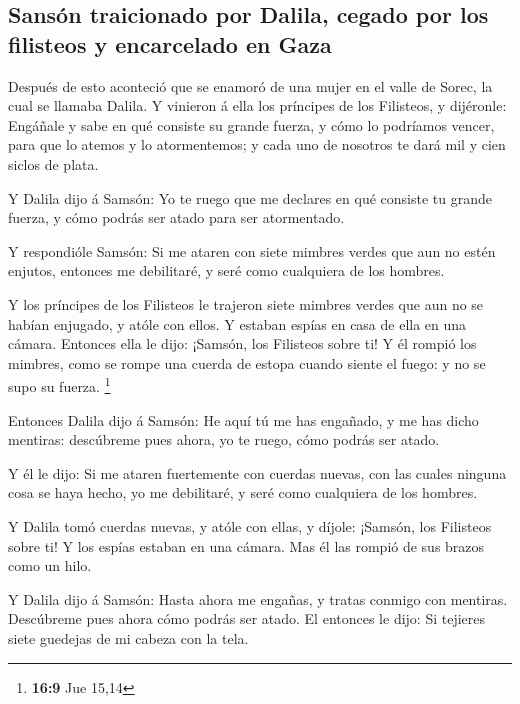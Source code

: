 \hypertarget{sansuxf3n-traicionado-por-dalila-cegado-por-los-filisteos-y-encarcelado-en-gaza}{%
\subsection{Sansón traicionado por Dalila, cegado por los filisteos y
encarcelado en
Gaza}\label{sansuxf3n-traicionado-por-dalila-cegado-por-los-filisteos-y-encarcelado-en-gaza}}

 Después de esto aconteció que se enamoró de una mujer en
el valle de Sorec, la cual se llamaba Dalila.  Y vinieron
á ella los príncipes de los Filisteos, y dijéronle: Engáñale y sabe en
qué consiste su grande fuerza, y cómo lo podríamos vencer, para que lo
atemos y lo atormentemos; y cada uno de nosotros te dará mil y cien
siclos de plata.

 Y Dalila dijo á Samsón: Yo te ruego que me declares en
qué consiste tu grande fuerza, y cómo podrás ser atado para ser
atormentado.

 Y respondióle Samsón: Si me ataren con siete mimbres
verdes que aun no estén enjutos, entonces me debilitaré, y seré como
cualquiera de los hombres.

 Y los príncipes de los Filisteos le trajeron siete
mimbres verdes que aun no se habían enjugado, y atóle con ellos.
 Y estaban espías en casa de ella en una cámara. Entonces
ella le dijo: ¡Samsón, los Filisteos sobre ti! Y él rompió los mimbres,
como se rompe una cuerda de estopa cuando siente el fuego: y no se supo
su fuerza. \footnote{\textbf{16:9} Jue 15,14}

 Entonces Dalila dijo á Samsón: He aquí tú me has
engañado, y me has dicho mentiras: descúbreme pues ahora, yo te ruego,
cómo podrás ser atado.

 Y él le dijo: Si me ataren fuertemente con cuerdas
nuevas, con las cuales ninguna cosa se haya hecho, yo me debilitaré, y
seré como cualquiera de los hombres.

 Y Dalila tomó cuerdas nuevas, y atóle con ellas, y
díjole: ¡Samsón, los Filisteos sobre ti! Y los espías estaban en una
cámara. Mas él las rompió de sus brazos como un hilo.

 Y Dalila dijo á Samsón: Hasta ahora me engañas, y tratas
conmigo con mentiras. Descúbreme pues ahora cómo podrás ser atado. El
entonces le dijo: Si tejieres siete guedejas de mi cabeza con la tela.

